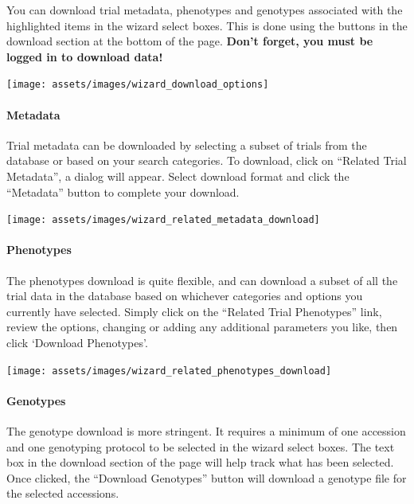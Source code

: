 \documentclass[
  12pt,
]{book}
\begin{document}
You can download trial metadata, phenotypes and genotypes associated with the highlighted items in the wizard select boxes. This is done using the buttons in the download section at the bottom of the page. \textbf{Don't forget, you must be logged in to download data!}

\begin{center}\texttt{[image: assets/images/wizard\_download\_options]} \end{center}

\hypertarget{metadata}{%
\paragraph*{Metadata}\label{metadata}}

Trial metadata can be downloaded by selecting a subset of trials from the database or based on your search categories. To download, click on ``Related Trial Metadata'', a dialog will appear. Select download format and click the ``Metadata'' button to complete your download.

\begin{center}\texttt{[image: assets/images/wizard\_related\_metadata\_download]} \end{center}

\hypertarget{phenotypes}{%
\paragraph*{Phenotypes}\label{phenotypes}}

The phenotypes download is quite flexible, and can download a subset of all the trial data in the database based on whichever categories and options you currently have selected. Simply click on the ``Related Trial Phenotypes'' link, review the options, changing or adding any additional parameters you like, then click `Download Phenotypes'.

\begin{center}\texttt{[image: assets/images/wizard\_related\_phenotypes\_download]} \end{center}

\hypertarget{genotypes}{%
\paragraph*{Genotypes}\label{genotypes}}

The genotype download is more stringent. It requires a minimum of one accession and one genotyping protocol to be selected in the wizard select boxes. The text box in the download section of the page will help track what has been selected. Once clicked, the ``Download Genotypes'' button will download a genotype file for the selected accessions.
\end{document}
